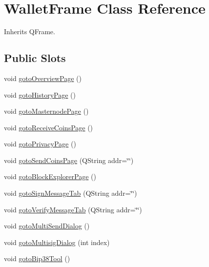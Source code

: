 \hypertarget{class_wallet_frame}{}\section{Wallet\+Frame Class Reference}
\label{class_wallet_frame}


Inherits Q\+Frame.

\subsection*{Public Slots}
\begin{DoxyCompactItemize}
\item 
void \mbox{\hyperlink{class_wallet_frame_a44a96de92558a91a95142943484c88e8}{goto\+Overview\+Page}} ()
\item 
void \mbox{\hyperlink{class_wallet_frame_a31071d5befc21c99718a8b31e1e403ee}{goto\+History\+Page}} ()
\item 
void \mbox{\hyperlink{class_wallet_frame_a6a58c9776d210a7a094742f6d580d1e1}{goto\+Masternode\+Page}} ()
\item 
void \mbox{\hyperlink{class_wallet_frame_af13b99dcec7b866d405aadd533bb7b9d}{goto\+Receive\+Coins\+Page}} ()
\item 
void \mbox{\hyperlink{class_wallet_frame_ae0d27b173bcae0871b5a081216a80681}{goto\+Privacy\+Page}} ()
\item 
void \mbox{\hyperlink{class_wallet_frame_a6c97ac7f36c595b1c1f4b7fd1c1dc880}{goto\+Send\+Coins\+Page}} (Q\+String addr=\char`\"{}\char`\"{})
\item 
void \mbox{\hyperlink{class_wallet_frame_ad6dd35096ee0df1990ed897ac6e51943}{goto\+Block\+Explorer\+Page}} ()
\item 
void \mbox{\hyperlink{class_wallet_frame_a386b4f2e20af7d13a688662cd3f9e1fc}{goto\+Sign\+Message\+Tab}} (Q\+String addr=\char`\"{}\char`\"{})
\item 
void \mbox{\hyperlink{class_wallet_frame_af5cce5026575d013cb9d6933ebe7aa98}{goto\+Verify\+Message\+Tab}} (Q\+String addr=\char`\"{}\char`\"{})
\item 
void \mbox{\hyperlink{class_wallet_frame_a4422d7faeabc6ea3eb09c7b195a362bb}{goto\+Multi\+Send\+Dialog}} ()
\item 
void \mbox{\hyperlink{class_wallet_frame_af4fff0e71372888b35c447b08eb37aaf}{goto\+Multisig\+Dialog}} (int index)
\item 
void \mbox{\hyperlink{class_wallet_frame_a0a22b92967e8811dcf4637fe6774fef1}{goto\+Bip38\+Tool}} ()
\item 

\end{DoxyCompactItemize}
